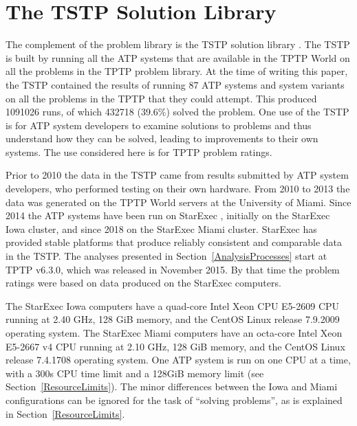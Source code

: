 \documentclass[runningheads]{llncs}
\begin{document}
\section{The TSTP Solution Library}
\label{TSTP}

The complement of the problem library is the TSTP solution library \cite{Sut07-CSR,Sut10}.
The TSTP is built by running all the ATP systems that are available in the TPTP World on
all the problems in the TPTP problem library.
At the time of writing this paper, the TSTP contained the results of running 87 ATP systems and 
system variants on all the problems in the TPTP that they could attempt.
This produced 1091026 runs, of which 432718 (39.6\%) solved the problem.
One use of the TSTP is for ATP system developers to examine solutions to problems and thus 
understand how they can be solved, leading to improvements to their own systems. 
The use considered here is for TPTP problem ratings.

Prior to 2010 the data in the TSTP came from results submitted by ATP system developers, who
performed testing on their own hardware.
From 2010 to 2013 the data was generated on the TPTP World servers at the University of Miami.
Since 2014 the ATP systems have been run on StarExec \cite{SST14}, initially on the StarExec
Iowa cluster, and since 2018 on the StarExec Miami cluster.
StarExec has provided stable platforms that produce reliably consistent and comparable data in
the TSTP.
The analyses presented in Section~\ref{AnalysisProcesses} start at TPTP v6.3.0, which was released 
in November 2015. 
By that time the problem ratings were 
based on data produced on the StarExec computers.

The StarExec Iowa computers have a
quad-core Intel Xeon CPU E5-2609 CPU running at 2.40 GHz,
128 GiB memory,
and the CentOS Linux release 7.9.2009 operating system.
The StarExec Miami computers have an
octa-core Intel Xeon E5-2667 v4 CPU running at 2.10 GHz,
128 GiB memory,
and the CentOS Linux release 7.4.1708 operating system.
One ATP system is run on one CPU at a time, with a 300s CPU time limit and a 128GiB memory
limit (see Section~\ref{ResourceLimits}).
The minor differences between the Iowa and Miami configurations can be ignored for the task
of ``solving problems'', as is explained in Section~\ref{ResourceLimits}.
\end{document}
